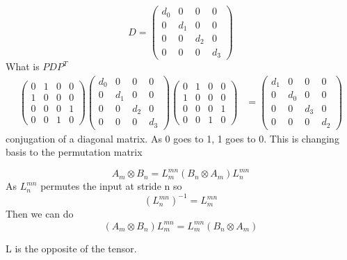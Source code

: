 \documentclass{article}
\begin{document}
	\begin{equation}
		D=\begin{pmatrix}
			d_0 & 0 & 0 & 0 \\
			0 & d_1 & 0 & 0 \\
			0 & 0 & d_2 & 0 \\
			0 & 0 & 0 & d_3
		\end{pmatrix}
	\end{equation}
	What is $PDP^T$
	\begin{align}
		\begin{pmatrix}
			0 & 1 & 0 & 0 \\
			1 & 0 & 0 & 0 \\
			0 & 0 & 0 & 1 \\
			0 & 0 & 1 & 0
		\end{pmatrix}
		\begin{pmatrix}
			d_0 & 0 & 0 & 0 \\
			0 & d_1 & 0 & 0 \\
			0 & 0 & d_2 & 0 \\
			0 & 0 & 0 & d_3
		\end{pmatrix}
		\begin{pmatrix}
			0 & 1 & 0 & 0 \\
			1 & 0 & 0 & 0 \\
			0 & 0 & 0 & 1 \\
			0 & 0 & 1 & 0
		\end{pmatrix}
		&=
		\begin{pmatrix}
			d_1 & 0 & 0 & 0 \\
			0 & d_0 & 0 & 0 \\
			0 & 0 & d_3 & 0 \\
			0 & 0 & 0 & d_2
		\end{pmatrix}
	\end{align}
	conjugation of a diagonal matrix. As 0 goes to 1, 1 goes to 0. This is changing basis to the permutation matrix
	
	\begin{equation}
		A_m \otimes B_n = L^{mn}_m (B_n \otimes A_m) L^{mn}_n
	\end{equation}
	As
	$L^{mn}_n$ permutes the input at stride n so
	\begin{equation}
		(L^{mn}_n)^{-1} = L^{mn}_m
	\end{equation}
	Then we can do
	\begin{equation}
		(A_m \otimes B_n) L^{mn}_m = L^{mn}_m (B_n \otimes A_m) 
	\end{equation}

	L is the opposite of the tensor.
	
\end{document}
